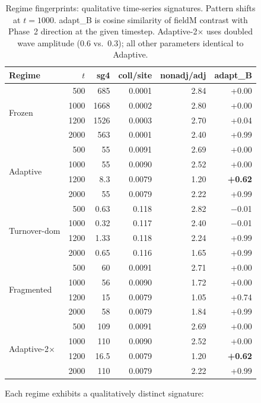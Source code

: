 \documentclass[11pt]{article}
\theoremstyle{remark}
\begin{document}
\begin{table}[h]
\centering
\caption{Regime fingerprints: qualitative time-series signatures. Pattern shifts
at $t = 1000$. adapt\_B is cosine similarity of fieldM contrast with Phase~2
direction at the given timestep. Adaptive-2$\times$ uses doubled wave amplitude
(0.6 vs.\ 0.3); all other parameters identical to Adaptive.}
\label{tab:exp4}
\begin{tabular}{lrrrrr}
\toprule
Regime & $t$ & sg4 & coll/site & nonadj/adj & adapt\_B \\
\midrule
\multirow{4}{*}{Frozen}
 & 500  & 685  & 0.0001 & 2.84 & +0.00 \\
 & 1000 & 1668 & 0.0002 & 2.80 & +0.00 \\
 & 1200 & 1526 & 0.0003 & 2.70 & +0.04 \\
 & 2000 & 563  & 0.0001 & 2.40 & +0.99 \\
\midrule
\multirow{4}{*}{Adaptive}
 & 500  & 55   & 0.0091 & 2.69 & +0.00 \\
 & 1000 & 55   & 0.0090 & 2.52 & +0.00 \\
 & 1200 & 8.3  & 0.0079 & 1.20 & \textbf{+0.62} \\
 & 2000 & 55   & 0.0079 & 2.22 & +0.99 \\
\midrule
\multirow{4}{*}{Turnover-dom}
 & 500  & 0.63 & 0.118 & 2.82 & $-$0.01 \\
 & 1000 & 0.32 & 0.117 & 2.40 & $-$0.01 \\
 & 1200 & 1.33 & 0.118 & 2.24 & +0.99 \\
 & 2000 & 0.65 & 0.116 & 1.65 & +0.99 \\
\midrule
\multirow{4}{*}{Fragmented}
 & 500  & 60   & 0.0091 & 2.71 & +0.00 \\
 & 1000 & 56   & 0.0090 & 1.72 & +0.00 \\
 & 1200 & 15   & 0.0079 & 1.05 & +0.74 \\
 & 2000 & 58   & 0.0079 & 1.84 & +0.99 \\
\midrule
\multirow{4}{*}{Adaptive-2$\times$}
 & 500  & 109  & 0.0091 & 2.69 & +0.00 \\
 & 1000 & 110  & 0.0090 & 2.52 & +0.00 \\
 & 1200 & 16.5 & 0.0079 & 1.20 & \textbf{+0.62} \\
 & 2000 & 110  & 0.0079 & 2.22 & +0.99 \\
\bottomrule
\end{tabular}
\end{table}

Each regime exhibits a qualitatively distinct signature:
\end{document}
